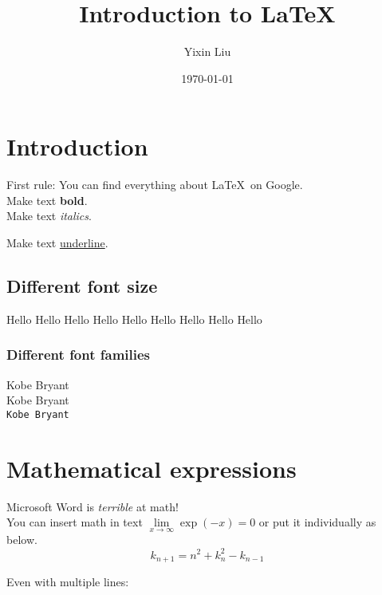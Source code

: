 \documentclass[12pt]{article}
\begin{document}
\date{\today}
\title{Introduction to \LaTeX}
\maketitle


\begin{center}
\author{\large Yixin Liu}
\end{center}

\section{Introduction} %
First rule: You can find everything about \LaTeX \ on Google. \\ 
Make text \textbf{bold}. \\
Make text \textit{italics}. \par
Make text \underline{underline}. 
 
\subsection{Different font size}
{\Huge Hello} {\LARGE Hello} {\Large Hello} {\large Hello} {\normalsize Hello} {\small Hello} {\footnotesize Hello} {\scriptsize Hello} {\tiny Hello}\\

\subsubsection{Different font families}
\textrm{Kobe Bryant} \\ 
\textsf{Kobe Bryant} \\ 
\texttt{Kobe Bryant} \\

\section{Mathematical expressions}
Microsoft Word is \textit{terrible} at math! \\ 
You can insert math in text $\lim\limits_{x \to \infty} \exp(-x) = 0$ or put it individually as below. \\

\begin{equation}
k_{n+1} = n^2 + k_n^2 - k_{n-1}
\end{equation}

Even with multiple lines:\\
\end{document}
